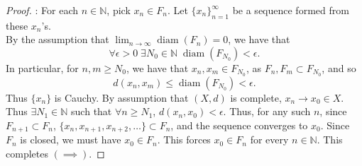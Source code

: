 \documentclass[notoc,notitlepage]{tufte-book}
\DeclareMathOperator{\diam}{diam }
\begin{document}
\begin{proof}
  : For each $n \in \mathbb{N}$, pick $x_n \in F_n$. Let $\{ x_n \}_{n = 1}^{\infty}$ be a sequence formed from these $x_n$'s. \\
  By the assumption that $\lim_{n \to \infty} \diam(F_n) = 0$, we have that
  \begin{equation*}
    \forall \epsilon > 0 \; \exists N_0 \in \mathbb{N} \; \diam \left( F_{N_0} \right) < \epsilon.
  \end{equation*}
  In particular, for $n, m \geq N_0$, we have that $x_n, x_m \in F_{N_0}$, as $F_n, F_m \subset F_{N_0}$, and so
  \begin{equation*}
    d(x_n, x_m) \leq \diam \left( F_{N_0} \right) < \epsilon.
  \end{equation*}
  Thus $\{ x_n \}$ is Cauchy. By assumption that $(X, d)$ is complete, $x_n \to x_0 \in X$. Thus $\exists N_1 \in \mathbb{N}$ such that $\forall n \geq N_1$, $d(x_n, x_0) < \epsilon$. Thus, for any such $n$, since $F_{n + 1} \subset F_n$, $\{ x_n, x_{n + 1}, x_{n + 2}, \ldots \} \subset F_n$, and the sequence converges to $x_0$. Since $F_n$ is closed, we must have $x_0 \in F_n$. This forces $x_0 \in F_n$ for every $n \in \mathbb{N}$. This completes $(\implies)$.


\end{proof}
\end{document}
